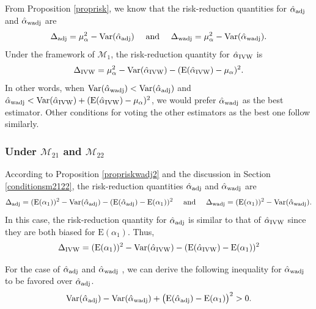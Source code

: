 \documentclass[11pt]{article}
\def\mrm#1{\mathrm{#1}} %
\def\mc#1{\mathcal{#1}} %
\def\E#1{\mathrm{E}(#1)} %
\def\var#1{\mathrm{Var}(#1)} %
\theoremstyle{definition}
\begin{document}
From Proposition \ref{proprisk}, we know that the risk-reduction quantities for $\hat{\alpha}_{\rm adj}$ and $\hat{\alpha}_{\rm wadj}$ are
\begin{align*}
  \Delta_{\rm adj} 
  = \mu_{\alpha}^2 -\var{\hat{\alpha}_{\rm adj}}
\quad   \text{ and } \quad 
  \Delta_{\rm wadj} 
  = \mu_{\alpha}^2-\var{\hat{\alpha}_{\rm wadj}}.
\end{align*}
Under the framework of $\mc{M}_1$, the risk-reduction quantity  for $\hat{\alpha}_{\rm IVW}$ is
\begin{align*}
  \Delta_{\rm IVW} = \mu_{\alpha}^2- \var{\hat{\alpha}_{\rm IVW}} -(\E{\hat{\alpha}_{\rm IVW}}-\mu_{\alpha})^2.
\end{align*}
In other words, when $\var{\hat{\alpha}_{\rm wadj}}<\var{\hat{\alpha}_{\rm adj}}$ and $\hat{\alpha}_{\rm wadj} < \var{\hat{\alpha}_{\rm IVW}} +(\E{\hat{\alpha}_{\rm IVW}}-\mu_{\alpha})^2$, we would prefer $\hat{\alpha}_{\rm wadj}$ as the best estimator. Other conditions for voting the other estimators as the best one follow similarly. 

\subsubsection{Under $\mc{M}_{21}$ and $\mc{M}_{22}$}

According to Proposition \ref{propriskwadj2} and the discussion in Section \ref{conditionsm2122}, the risk-reduction quantities $\hat{\alpha}_{\rm adj}$ and $\hat{\alpha}_{\rm wadj}$ are
\begin{align*}
  \Delta_{\rm adj} 
  = (\E{\alpha_1})^2 -\var{\hat{\alpha}_{\rm adj}} -(\E{\hat{\alpha}_{\rm adj}}-\E{\alpha_1})^2
\quad   \text{ and } \quad 
  \Delta_{\rm wadj} 
  = (\E{\alpha_1})^2-\var{\hat{\alpha}_{\rm wadj}}.
\end{align*}
In this case, the risk-reduction quantity for $\hat{\alpha}_{\rm adj}$ is similar to that of $\hat{\alpha}_{\rm IVW}$ since they are both biased for $\E{\alpha_1}$.  Thus,
\begin{align*}
 \Delta_{\rm IVW} 
  = (\E{\alpha_1})^2 -\var{\hat{\alpha}_{\rm IVW}} -(\E{\hat{\alpha}_{\rm IVW}}-\E{\alpha_1})^2
\end{align*}

For the case of $\hat{\alpha}_{\rm adj}$ and $\hat{\alpha}_{\rm wadj}$ , we can derive the following inequality for $\hat{\alpha}_{\rm wadj}$ to be favored over $\hat{\alpha}_{\rm adj}$.
 \begin{align*}
  \var{\hat{\alpha}_{\rm adj}} 
  -\var{\hat{\alpha}_{\rm wadj}} + \big(\E{\hat{\alpha}_{\rm adj}}-\mrm{E}(\alpha_1)\big)^2> 0.
\end{align*}
 
\end{document}
